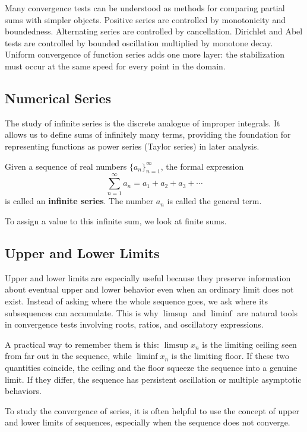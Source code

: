 Many convergence tests can be understood as methods for comparing partial sums with simpler objects. Positive series are controlled by monotonicity and boundedness. Alternating series are controlled by cancellation. Dirichlet and Abel tests are controlled by bounded oscillation multiplied by monotone decay. Uniform convergence of function series adds one more layer: the stabilization must occur at the same speed for every point in the domain.

\subsection{Numerical Series}

The study of infinite series is the discrete analogue of improper integrals. It allows us to define sums of infinitely many terms, providing the foundation for representing functions as power series (Taylor series) in later analysis.

\begin{definition}
Given a sequence of real numbers $\{a_n\}_{n=1}^{\infty}$, the formal expression
\[ \sum_{n=1}^{\infty} a_n = a_1 + a_2 + a_3 + \cdots \]
is called an \textbf{infinite series}. The number $a_n$ is called the general term.
\end{definition}

To assign a value to this infinite sum, we look at finite sums.

\subsection{Upper and Lower Limits}


Upper and lower limits are especially useful because they preserve information about eventual upper and lower behavior even when an ordinary limit does not exist. Instead of asking where the whole sequence goes, we ask where its subsequences can accumulate. This is why $\limsup$ and $\liminf$ are natural tools in convergence tests involving roots, ratios, and oscillatory expressions.

A practical way to remember them is this: $\limsup x_n$ is the limiting ceiling seen from far out in the sequence, while $\liminf x_n$ is the limiting floor. If these two quantities coincide, the ceiling and the floor squeeze the sequence into a genuine limit. If they differ, the sequence has persistent oscillation or multiple asymptotic behaviors.

To study the convergence of series, it is often helpful to use the concept of upper and lower limits of sequences, especially when the sequence does not converge.

